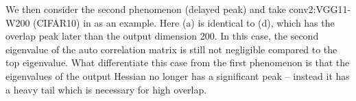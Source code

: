 
We then consider the second phenomenon (delayed peak) and take conv2:VGG11-W200 (CIFAR10) in as an example. Here (a) is identical to (d), which has the overlap peak later than the output dimension 200. In this case, the second eigenvalue of the auto correlation matrix is still not negligible compared to the top eigenvalue. What differentiate this case from the first phenomenon is that the eigenvalues of the output Hessian no longer has a significant peak \--- instead it has a heavy tail which is necessary for high overlap.

